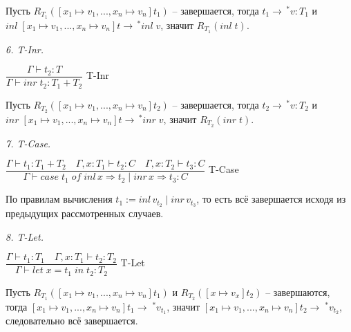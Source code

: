 \documentclass[landscape, 11pt]{report}
\begin{document}
	\vspace{0.2cm}
	
	Пусть $R_{T_1}([x_1 \mapsto v_1, ..., x_n \mapsto v_n]t_1)$ -- завершается, тогда $t_1 \rightarrow \, ^{*}v : T_1$ и $inl \; [x_1 \mapsto v_1, ..., x_n \mapsto v_n]t \rightarrow \, ^{*}inl \; v$, значит $R_{T_1}(inl \; t)$.

	\vspace{0.2cm}
	
	\textit{6. T-Inr.}

	\vspace{0.2cm}
	
	$\dfrac{\Gamma \vdash t_2 : T}{\Gamma \vdash inr \; t_2 : T_1 + T_2}$ T-Inr
	
	\vspace{0.2cm}
	
	Пусть $R_{T_2}([x_1 \mapsto v_1, ..., x_n \mapsto v_n]t_2)$ -- завершается, тогда $t_2 \rightarrow \, ^{*}v : T_2$ и $inr \; [x_1 \mapsto v_1, ..., x_n \mapsto v_n]t \rightarrow \, ^{*}inr \; v$, значит $R_{T_2}(inr \; t)$.
	
	\newpage

	\textit{7. T-Case.}
	
	\vspace{0.2cm}
	
	$\dfrac{\Gamma \vdash t_1 : T_1 + T_2 \quad \Gamma, x : T_1 \vdash t_2 : C \quad \Gamma, x : T_2 \vdash t_3 : C}{\Gamma \vdash case \; t_1 \; of \; inl \, x \Rightarrow t_2 \; | \; inr \, x \Rightarrow t_3 : C}$ T-Case
	
	\vspace{0.2cm}
	
	По правилам вычисления $t_1 := inl \, v_{t_2} \; | \; inr \, v_{t_3}$, то есть всё завершается исходя из предыдущих рассмотренных случаев.
	
	\vspace{0.2cm}

	\textit{8. T-Let.}
	
	\vspace{0.2cm}
	
	$\dfrac{\Gamma \vdash t_1 : T_1 \quad \Gamma, x : T_1 \vdash t_2 : T_2}{\Gamma \vdash let \; x = t_1 \; in \; t_2 : T_2}$ T-Let
	
	\vspace{0.2cm}
	
	Пусть $R_{T_1}([x_1 \mapsto v_1, ..., x_n \mapsto v_n]t_1)$ и $R_{T_2}([x \mapsto v_x]t_2)$ -- завершаются, тогда $[x_1 \mapsto v_1, ..., x_n \mapsto v_n]t_1 \rightarrow \; ^{*}v_{t_1}$, \newline
	значит $[x_1 \mapsto v_1, ..., x_n \mapsto v_n]t_2 \rightarrow \; ^{*}v_{t_2}$, следовательно всё завершается.
\end{document}
